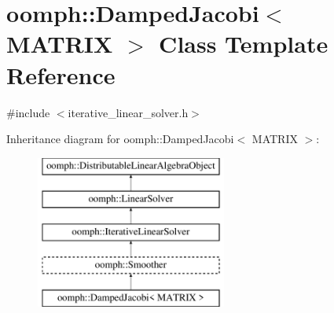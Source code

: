 \hypertarget{classoomph_1_1DampedJacobi}{}\section{oomph\+:\+:Damped\+Jacobi$<$ M\+A\+T\+R\+IX $>$ Class Template Reference}
\label{classoomph_1_1DampedJacobi}


{\ttfamily \#include $<$iterative\+\_\+linear\+\_\+solver.\+h$>$}

Inheritance diagram for oomph\+:\+:Damped\+Jacobi$<$ M\+A\+T\+R\+IX $>$\+:\begin{figure}[H]
\begin{center}
\leavevmode
\includegraphics[height=5.000000cm]{classoomph_1_1DampedJacobi}
\end{center}
\end{figure}
